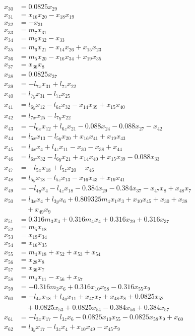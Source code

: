 \documentclass[11pt]{article}
\begin{document}
\begin{align*}
x_{30} &= 0.0825 x_{29} \\
x_{31} &= x_{16} x_{20} - x_{18} x_{19} \\
x_{32} &= - x_{31} \\
x_{33} &= m_{7} x_{31} \\
x_{34} &= m_{6} x_{32} - x_{33} \\
x_{35} &= m_{6} x_{21} - x_{14} x_{26} + x_{15} x_{23} \\
x_{36} &= m_{5} x_{20} - x_{16} x_{34} + x_{19} x_{35} \\
x_{37} &= x_{36} x_{8} \\
x_{38} &= 0.0825 x_{37} \\
x_{39} &= - l_{7x} x_{31} + l_{7z} x_{22} \\
x_{40} &= l_{7y} x_{31} - l_{7z} x_{25} \\
x_{41} &= l_{6y} x_{12} - l_{6z} x_{32} - x_{14} x_{39} + x_{15} x_{40} \\
x_{42} &= l_{7x} x_{25} - l_{7y} x_{22} \\
x_{43} &= - l_{6x} x_{12} + l_{6z} x_{21} - 0.088 x_{24} - 0.088 x_{27} - x_{42} \\
x_{44} &= l_{5x} x_{13} - l_{5y} x_{20} + x_{16} x_{41} + x_{19} x_{43} \\
x_{45} &= l_{4x} x_{4} + l_{4z} x_{11} - x_{30} - x_{38} + x_{44} \\
x_{46} &= l_{6x} x_{32} - l_{6y} x_{21} + x_{14} x_{40} + x_{15} x_{39} - 0.088 x_{33} \\
x_{47} &= - l_{5x} x_{18} + l_{5z} x_{20} - x_{46} \\
x_{48} &= l_{5y} x_{18} - l_{5z} x_{13} - x_{16} x_{43} + x_{19} x_{41} \\
x_{49} &= - l_{4y} x_{4} - l_{4z} x_{18} - 0.384 x_{29} - 0.384 x_{37} - x_{47} x_{8} + x_{48} x_{7} \\
x_{50} &= l_{3x} x_{4} + l_{3y} x_{6} + 0.809325 m_{4} x_{1} x_{3} + x_{10} x_{45} + x_{30} + x_{38} \\
&\quad + x_{49} x_{9} \\
x_{51} &= 0.316 m_{3} x_{4} + 0.316 m_{4} x_{4} + 0.316 x_{29} + 0.316 x_{37} \\
x_{52} &= m_{5} x_{18} \\
x_{53} &= x_{19} x_{34} \\
x_{54} &= x_{16} x_{35} \\
x_{55} &= m_{4} x_{18} + x_{52} + x_{53} + x_{54} \\
x_{56} &= x_{28} x_{8} \\
x_{57} &= x_{36} x_{7} \\
x_{58} &= m_{4} x_{11} - x_{56} + x_{57} \\
x_{59} &= - 0.316 m_{3} x_{6} + 0.316 x_{10} x_{58} - 0.316 x_{55} x_{9} \\
x_{60} &= - l_{4x} x_{18} + l_{4y} x_{11} + x_{47} x_{7} + x_{48} x_{8} + 0.0825 x_{52} \\
&\quad + 0.0825 x_{53} + 0.0825 x_{54} - 0.384 x_{56} + 0.384 x_{57} \\
x_{61} &= - l_{3x} x_{17} - l_{3z} x_{6} - 0.0825 x_{10} x_{55} - 0.0825 x_{58} x_{9} + x_{60} \\
x_{62} &= l_{3y} x_{17} - l_{3z} x_{4} + x_{10} x_{49} - x_{45} x_{9}
\end{align*}
\end{document}
